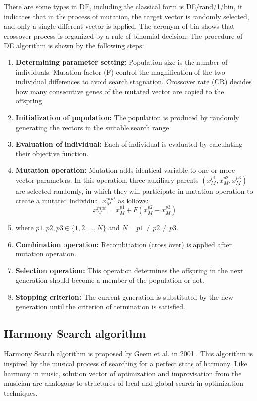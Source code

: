 \documentclass[10pt,letterpaper]{article}
\begin{document}
There are some types in DE, including the classical form is DE/rand/1/bin, it indicates that in the process of mutation, the target vector is randomly selected, and only a single different vector is applied. The acronym of bin shows that crossover process is organized by a rule of binomial decision. The procedure of DE algorithm is shown by the following steps:

\begin{enumerate}
    \item \textbf{Determining parameter setting:} Population size is the number of individuals. Mutation factor (F) control the magnification of the two individual differences to avoid search stagnation. Crossover rate (CR) decides how many consecutive genes of the mutated vector are copied to the offspring.
    \item \textbf{Initialization of population:} The population is produced by randomly generating the vectors in the suitable search range. 
    \item \textbf{Evaluation of individual:} Each of individual is evaluated by calculating their objective function. 
    \item \textbf{Mutation operation:} Mutation adds identical variable to one or more vector parameters. In this operation, three auxiliary parents \((x_M^{p1}, x_M^{p2}, x_M^{p3})\) are selected randomly, in which they will participate in mutation operation to create a mutated individual \( x_M^{mut}\) as follows:
    \begin{equation}
        x_M^{mut}=x_M^{p1}+F(x_M^{p2}-x_M^{p3})
    \end{equation} 
    
    \item[] where \(p1, p2, p3 \in \big\{1, 2, \dots, N \big\} \) and \(N = p1 \neq p2 \neq p3\).
    
    \item \textbf{Combination operation:} Recombination (cross over) is applied after mutation operation. 
    \item \textbf{Selection operation:} This operation determines the offspring in the next generation should become a member of the population or not. 
    \item \textbf{Stopping criterion:} The current generation is substituted by the new generation until the criterion of termination is satisfied.
\end{enumerate}

\subsection{Harmony Search algorithm}
Harmony Search algorithm is proposed by Geem et al. in 2001 \cite{Lee}. This algorithm is inspired by the musical process of searching for a perfect state of harmony. Like harmony in music, solution vector of optimization and improvisation from the musician are analogous to structures of local and global search in optimization techniques.
\end{document}
